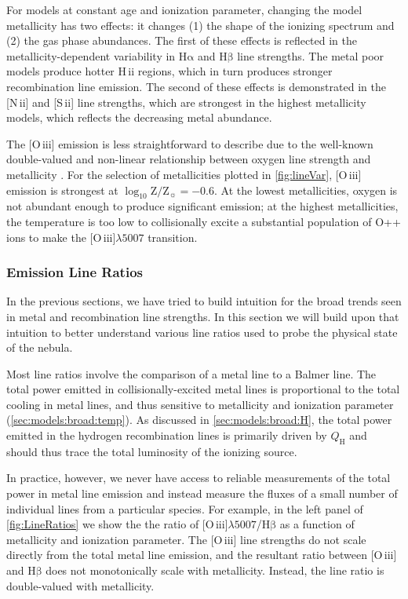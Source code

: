 \documentclass[trackchanges, twocolumn, tighten]{aastex61}
\newcommand{\Fig}[1]{\autoref{fig:#1}}
\newcommand{\Sec}[1]{\autoref{sec:#1}}
\newcommand{\logten}{\ensuremath{\log_{10}}}
\newcommand{\nii}{[N\,{\sc ii}]\xspace}
\newcommand{\sii}{[S\,{\sc ii}]\xspace}
\newcommand{\oiii}{[O\,{\sc iii}]\xspace}
\newcommand{\ha}{\ensuremath{\mathrm{H\alpha}}}
\newcommand{\hb}{\ensuremath{\mathrm{H\beta}}}
\newcommand{\hii}{H\,{\sc ii}\xspace}
\newcommand\lam[1]{\ensuremath{\lambda #1}}
\newcommand{\logZeq}[1]{\ensuremath{\logten \mathrm{Z}/\mathrm{Z}_{\sun} = #1}}
\newcommand{\QH}{\ensuremath{Q_{\mathrm{H}}}}
\newcommand\oiiihb{\oiii{}\lam{5007}/\hb{}}
\begin{document}
For models at constant age and ionization parameter, changing the model metallicity has two effects: it changes (1) the shape of the ionizing spectrum and (2) the gas phase abundances. The first of these effects is reflected in the metallicity-dependent variability in \ha{} and \hb{} line strengths. The metal poor models produce hotter \hii regions, which in turn produces stronger recombination line emission. The second of these effects is demonstrated in the \nii{} and \sii{} line strengths, which are strongest in the highest metallicity models, which reflects the decreasing metal abundance.

The \oiii{} emission is less straightforward to describe due to the well-known double-valued and non-linear relationship between oxygen line strength and metallicity \citep{Pilyugin05, Kewley08}. For the selection of metallicities plotted in \Fig{lineVar}, \oiii{} emission is strongest at \logZeq{-0.6}. At the lowest metallicities, oxygen is not abundant enough to produce significant emission; at the highest metallicities, the temperature is too low to collisionally excite a substantial population of O++ ions to make the \oiii{}\lam{5007} transition. 

\subsubsection{Emission Line Ratios}\label{sec:models:lines:ratios}

In the previous sections, we have tried to build intuition for the broad trends seen in metal and recombination line strengths. In this section we will build upon that intuition to better understand various line ratios used to probe the physical state of the nebula.

Most line ratios involve the comparison of a metal line to a Balmer line. The total power emitted in collisionally-excited metal lines is proportional to the total cooling in metal lines, and thus sensitive to metallicity and ionization parameter (\Sec{models:broad:temp}). As discussed in \Sec{models:broad:H}, the total power emitted in the hydrogen recombination lines is primarily driven by \QH{} and should thus trace the total luminosity of the ionizing source. 

In practice, however, we never have access to reliable measurements of the total power in metal line emission and instead measure the fluxes of a small number of individual lines from a particular species. For example, in the left panel of \Fig{LineRatios} we show the the ratio of \oiiihb{} as a function of metallicity and ionization parameter. The \oiii{} line strengths do not scale directly from the total metal line emission, and the resultant ratio between \oiii{} and \hb{} does not monotonically scale with metallicity. Instead, the line ratio is double-valued with metallicity.
\end{document}

